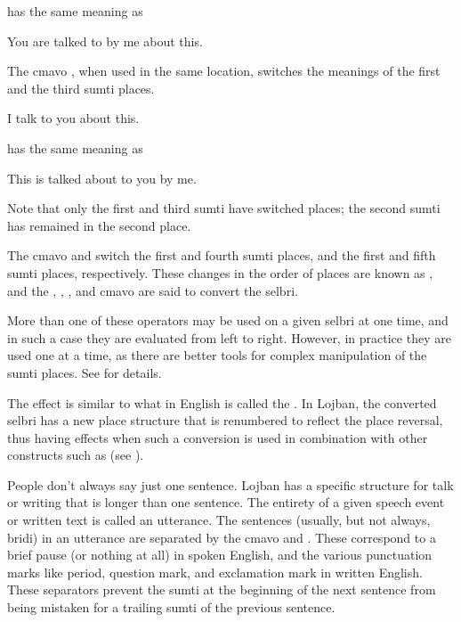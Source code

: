 {\noindent}has the same meaning as
\begin{example}
   \n
You are talked to by me about this.
\end{example}

The cmavo , when used in the same location, switches the meanings of the first and the third sumti places.
\begin{example}
   \n
I talk to you about this.
\end{example}

{\noindent}has the same meaning as
\begin{example}
   \n
This is talked about to you by me.
\end{example}

Note that only the first and third sumti have switched places; the second sumti has remained in the second place.

The cmavo  and  switch the first and fourth sumti places, and the first and fifth sumti places, respectively. These changes in the order of places are known as , and the , , , and  cmavo are said to convert the selbri.

More than one of these operators may be used on a given selbri at one time, and in such a case they are evaluated from left to right. However, in practice they are used one at a time, as there are better tools for complex manipulation of the sumti places. See  for details.

The effect is similar to what in English is called the . In Lojban, the converted selbri has a new place structure that is renumbered to reflect the place reversal, thus having effects when such a conversion is used in combination with other constructs such as  (see ).



People don't always say just one sentence. Lojban has a specific structure for talk or writing that is longer than one sentence. The entirety of a given speech event or written text is called an utterance. The sentences (usually, but not always, bridi) in an utterance are separated by the cmavo  and . These correspond to a brief pause (or nothing at all) in spoken English, and the various punctuation marks like period, question mark, and exclamation mark in written English. These separators prevent the sumti at the beginning of the next sentence from being mistaken for a trailing sumti of the previous sentence.

